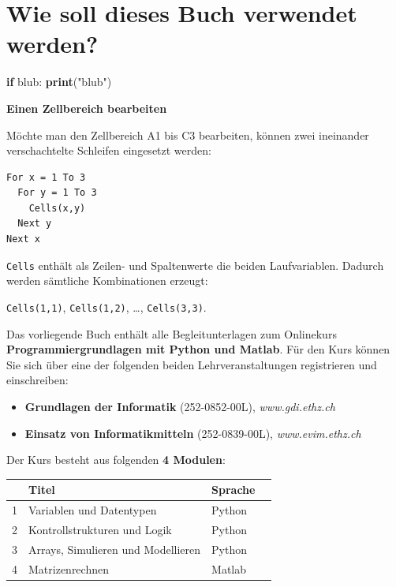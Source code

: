 \documentclass[10pt,paper=17cm:22cm, twoside=true, DIV=14]{scrbook}
\newenvironment {info}
          {\begin{mdframed}[style=info] }
          {\end{mdframed} }
\newenvironment {Shaded}
        {\begin{mdframed}[style=code] }
         {\end{mdframed}}
\newcommand{\BuiltInTok}[1]{\textcolor[rgb]{0.1,0.1,0.1}{\textbf{#1}}}
\newcommand{\StringTok}[1]{\textcolor[rgb]{0.4,0.4,0.4}{{#1}}}
\newcommand{\NormalTok}[1]{#1}
\newcommand{\ControlFlowTok}[1]{{\textbf{#1}}}
\providecommand{\tightlist}{%
  \setlength{\itemsep}{0pt}\setlength{\parskip}{0pt}}
\begin{document}
\setcounter{tocdepth}{2}
\tableofcontents

\mainmatter

\chapter{Wie soll dieses Buch verwendet werden?}

\begin{Shaded}
\begin{Highlighting}[]
\ControlFlowTok{if} \NormalTok{blub:}
  \BuiltInTok{print}\NormalTok{(}\StringTok{"blub"}\NormalTok{)}
\end{Highlighting}
\end{Shaded}

\begin{info}
\textbf{Einen Zellbereich bearbeiten}

Möchte man den Zellbereich A1 bis C3 bearbeiten, können zwei ineinander
verschachtelte Schleifen eingesetzt werden:

\begin{verbatim}
For x = 1 To 3
  For y = 1 To 3
    Cells(x,y)
  Next y
Next x
\end{verbatim}

\texttt{Cells} enthält als Zeilen- und Spaltenwerte die beiden
Laufvariablen. Dadurch werden sämtliche Kombinationen erzeugt:

\texttt{Cells(1,1)}, \texttt{Cells(1,2)}, \ldots{}, \texttt{Cells(3,3)}.
\end{info}

Das vorliegende Buch enthält alle Begleitunterlagen zum Onlinekurs
\textbf{Programmiergrundlagen mit Python und Matlab}. Für den Kurs
können Sie sich über eine der folgenden beiden Lehrveranstaltungen
registrieren und einschreiben:

\begin{itemize}
\tightlist
\item
  \textbf{Grundlagen der Informatik} (252-0852-00L),
  \emph{www.gdi.ethz.ch}
\item
  \textbf{Einsatz von Informatikmitteln} (252-0839-00L),
  \emph{www.evim.ethz.ch}
\end{itemize}

Der Kurs besteht aus folgenden \textbf{4 Modulen}:

\begin{table}[!htbp]\centering
\begin{tabular}{@{}llll@{}}
\toprule
 & Titel & Sprache \\
\midrule
 1 & Variablen und Datentypen & Python \\
 2 & Kontrollstrukturen und Logik & Python \\
 3 & Arrays, Simulieren und Modellieren & Python \\
 4 & Matrizenrechnen & Matlab \\
\bottomrule
\end{tabular}
\end{table}
\end{document}
